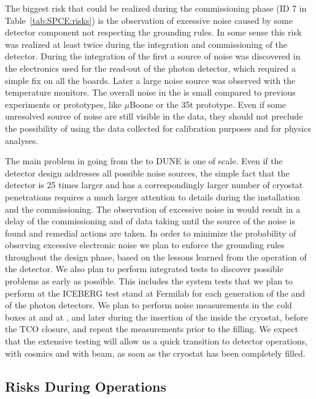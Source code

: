 The biggest risk that could be realized during the commissioning phase
(ID 7 in Table~\ref{tab:SPCE:risks}) is the observation of excessive noise 
caused by some detector component not respecting the  grounding
rules. In some sense this risk was realized at least twice during the 
integration and commissioning of the  detector. During the 
integration of the first  a source of noise was discovered 
in the electronics used for the read-out of the photon  detector, which 
required a simple fix on all the boards. Later a large noise source was 
observed with the temperature monitors. The overall noise in the  
is small compared to previous  experiments or prototypes, 
like $\mu$Boone or the 35t prototype. Even if some unresolved source of noise 
are still visible in the  data, they should not preclude the 
possibility of using the data collected for calibration purposes and for 
physics analyses. 

The main problem in going from the  to DUNE is one of scale.
Even if the detector design addresses all possible noise sources, the simple
fact that the detector is 25 times larger and has a correspondingly larger
number of cryostat penetrations requires a much larger attention to details
during the installation and the commissioning. The observation of excessive 
noise in  would result in a delay of the commissioning and of 
data taking until the source of the noise is found and remedial actions 
are taken. In order to minimize the probability of observing excessive 
electronic noise we plan to enforce the grounding  rules throughout the 
design phase, based on the lessons learned from the operation of the 
 detector. We also plan to perform  integrated tests to discover 
possible problems as early as possible. This includes the system tests that 
we plan to perform at the ICEBERG test stand at Fermilab for each generation 
of the  and of the photon detectors. We plan to perform noise 
measurements in the cold boxes at  and at \surf, and later 
during the insertion of the  inside the cryostat, before the 
TCO closure, and repeat the measurements prior to the  filling. 
We expect that the extensive testing will allow us a quick transition to 
detector operations, with cosmics and with beam, as soon as the cryostat 
has been completely filled. 

\subsection{Risks During Operations}
\label{sec:fdsp-tpcelec-risks-operations}


